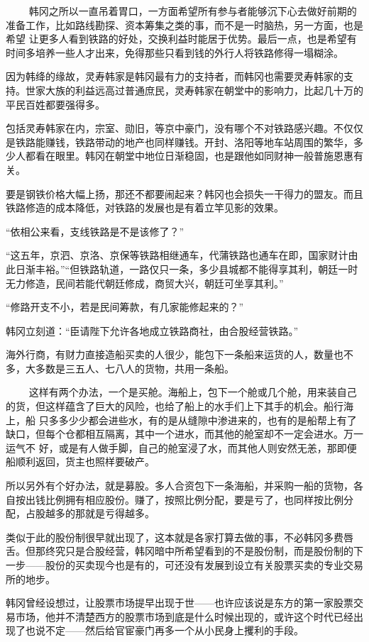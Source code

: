 　
　韩冈之所以一直吊着胃口，一方面希望所有参与者能够沉下心去做好前期的准备工作，比如路线勘探、资本筹集之类的事，而不是一时脑热，另一方面，也是希望
让更多人看到铁路的好处，交换利益时能居于优势。最后一点，也是希望有时间多培养一些人才出来，免得那些只看到钱的外行人将铁路修得一塌糊涂。

因为韩绛的缘故，灵寿韩家是韩冈最有力的支持者，而韩冈也需要灵寿韩家的支持。世家大族的利益远高过普通庶民，灵寿韩家在朝堂中的影响力，比起几十万的平民百姓都要强得多。

包括灵寿韩家在内，宗室、勋旧，等京中豪门，没有哪个不对铁路感兴趣。不仅仅是铁路能赚钱，铁路带动的地产也同样赚钱。开封、洛阳等地车站周围的繁华，多少人都看在眼里。韩冈在朝堂中地位日渐稳固，也是跟他如同财神一般普施恩惠有关。

要是钢铁价格大幅上扬，那还不都要闹起来？韩冈也会损失一干得力的盟友。而且铁路修造的成本降低，对铁路的发展也是有着立竿见影的效果。

“依相公来看，支线铁路是不是该修了？”

“这五年，京泗、京洛、京保等铁路相继通车，代蒲铁路也通车在即，国家财计由此日渐丰裕。”“但铁路轨道，一路仅只一条，多少县城都不能得享其利，朝廷一时无力修造，民间若能代朝廷修成，商贸大兴，朝廷可坐享其利。”

“修路开支不小，若是民间筹款，有几家能修起来的？”

韩冈立刻道：“臣请陛下允许各地成立铁路商社，由合股经营铁路。”

海外行商，有财力直接造船买卖的人很少，能包下一条船来运货的人，数量也不多，大多数是三五人、七八人的货物，共用一条船。

　
　这样有两个办法，一个是买舱。海船上，包下一个舱或几个舱，用来装自己的货，但这样蕴含了巨大的风险，也给了船上的水手们上下其手的机会。船行海上，船
只多多少少都会进些水，有的是从缝隙中渗进来的，也有的是船帮上有了缺口，但每个仓都相互隔离，其中一个进水，而其他的舱室却不一定会进水。万一运气不
好，或是有人做手脚，自己的舱室浸了水，而其他人则安然无恙，那即便船顺利返回，货主也照样要破产。

所以另外有个好办法，就是募股。多人合资包下一条海船，并采购一船的货物，各自按出钱比例拥有相应股份。赚了，按照比例分配，要是亏了，也同样按比例分配，占股越多的那就是亏得越多。

类似于此的股份制很早就出现了，这本就是各家打算去做的事，不必韩冈多费唇舌。但那终究只是合股经营，韩冈暗中所希望看到的不是股份制，而是股份制的下一步——股份的买卖现今也是有的，可还没有发展到设立有关股票买卖的专业交易所的地步。

韩冈曾经设想过，让股票市场提早出现于世——也许应该说是东方的第一家股票交易市场，他并不清楚西方的股票市场到底是什么时候出现的，或许这个时代已经出现了也说不定——然后给官宦豪门再多一个从小民身上攫利的手段。

